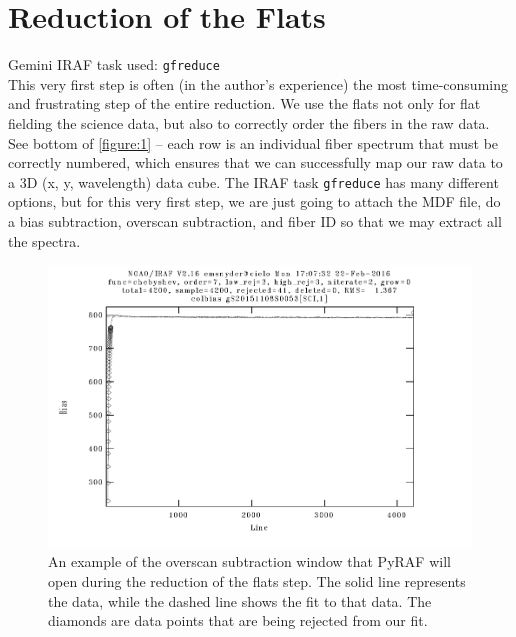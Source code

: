 \documentclass[12pt]{report}
\begin{document}
\bigskip
\section{Reduction of the Flats}
\label{fibers}

\noindent Gemini IRAF task used: \texttt{gfreduce} \\

\noindent This very first step is often (in the author's experience) the most time-consuming and frustrating step of the entire reduction. We use the flats not only for flat fielding the science data, but also to correctly order the fibers in the raw data. See bottom of \autoref{figure:1} -- each row is an individual fiber spectrum that must be correctly numbered, which ensures that we can successfully map our raw data to a 3D (x, y, wavelength) data cube. The IRAF task \texttt{gfreduce} has many different options, but for this very first step, we are just going to attach the MDF file, do a bias subtraction, overscan subtraction, and fiber ID so that we may extract all the spectra.

\begin{figure}[h]
\centering
\includegraphics{overscan_example}
\caption[Overscan Subtraction Example]{An example of the overscan subtraction window that PyRAF will open during the reduction of the flats step. The solid line represents the data, while the dashed line shows the fit to that data. The diamonds are data points that are being rejected from our fit.}
\label{fig:overscan}
\end{figure}
\end{document}
